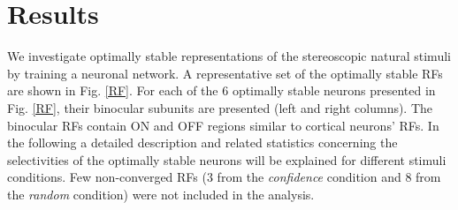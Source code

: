 \section{Results}

We investigate optimally stable representations of the stereoscopic natural
stimuli by training a neuronal network. A representative set of the
optimally stable RFs are shown in Fig. \ref{RF}. For each of the 6
optimally stable neurons presented in Fig. \ref{RF}, their binocular subunits
are presented (left and right columns). The binocular RFs contain ON and
OFF regions similar to cortical neurons' RFs. In the following a detailed
description and related statistics concerning the selectivities of the
optimally stable neurons will be explained for different stimuli
conditions. Few non-converged RFs (3 from the \textit{confidence} condition
and 8 from the \textit{random} condition) were not included in the
analysis.



